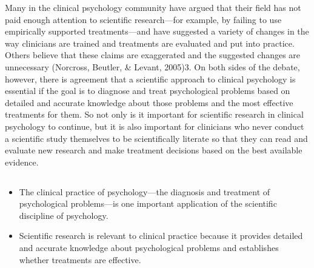 Many in the clinical psychology community have argued that their field has not paid enough attention to scientific research---for example, by failing to use empirically supported treatments---and have suggested a variety of changes in the way clinicians are trained and treatments are evaluated and put into practice. Others believe that these claims are exaggerated and the suggested changes are unnecessary (Norcross, Beutler, \& Levant, 2005)3. On both sides of the debate, however, there is agreement that a scientific approach to clinical psychology is essential if the goal is to diagnose and treat psychological problems based on detailed and accurate knowledge about those problems and the most effective treatments for them. So not only is it important for scientific research in clinical psychology to continue, but it is also important for clinicians who never conduct a scientific study themselves to be scientifically literate so that they can read and evaluate new research and make treatment decisions based on the best available evidence.

\subsection{}
\begin{fullwidth}
\begin{itemize}
\item The clinical practice of psychology—the diagnosis and treatment of psychological problems—is one important application of the scientific discipline of psychology.
\item Scientific research is relevant to clinical practice because it provides detailed and accurate knowledge about psychological problems and establishes whether treatments are effective.
\end{itemize}
\end{fullwidth}

